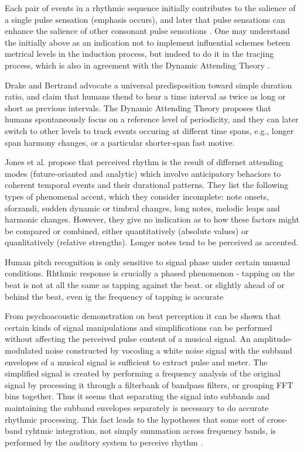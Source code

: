 \documentclass{scrartcl}
\begin{document}
Each pair of events in a rhythmic sequence initially contributes to the salience of a single pulse sensation (emphasis occurs), and later that pulse sensations can enhance the salience of other consonant pulse sensations \cite{Parncutt1994}. One may understand the initially above as an indication not to implement influential schemes beteen metrical levels in the induction process, but imdeed to do it in the tracjing process, which is also in agreement with the Dynamic Attending Theory \cite{Jones1989}. 

Drake and Bertrand \cite{Drake2001} advocate a universal predisposition toward simple duration ratio, and claim that humans thend to hear a time interval as twice as long or short as previous intervals. The Dynamic Attending Theory \cite{Jones1989} proposes that humans spontaneously focus on a reference level of periodicity, and they can later switch to other levels to track events occuring at differnt time spans, e.g., longer span harmony changes, or a particular shorter-span fast motive.

Jones et al. \cite{Jones1989} propose that perceived rhythm is the result of differnet attending modes (future-orianted and analytic) which involve anticipatory behaciors to coherent temporal events and their durational patterns. They list the following types of phenomenal accent, which they consider incomplete: note onsets, sforzandi, sudden dynamic or timbral changes, long notes, melodic leaps and harmonic changes. However, they give no indication as to how these factors might be compared or combined, either quantitatively (absolute values) or quanlitatively (relative strengths). Longer notes tend to be perceived as accented.

Human pitch recognition is only sensitive to signal phase under certain unusual conditions. Rhthmic response is crucially a phased phenomenon - tapping on the beat is not at all the same as tapping against the beat. or slightly ahead of or behind the beat, even ig the frequency of tapping is accurate \cite{Scheirer1998}

From psychoacoustic demonstration on beat perception it can be shown that certain kinds of signal manipulations and simplifications can be performed without affecting the perceived pulse content of a musical signal. An amplitude-modulated noise constructed by vocoding a white noise signal with the subband envelopes of a musical signal is sufficient to extract pulse and meter. The simplified signal is created by performing a frequency analysis of the original signal by processing it through a filterbank of bandpass filters, or grouping FFT bins together. Thus it seems that separating the signal into subbands and maintaining the subband envelopes separately is necessary to do accurate rhythmic processing. This fact leads to the hypotheses that some sort of cross-band ryhtmic integration, not simply summation across frequency bands, is performed by the auditory system to perceive rhythm \cite{Scheirer1998}.
\end{document}
